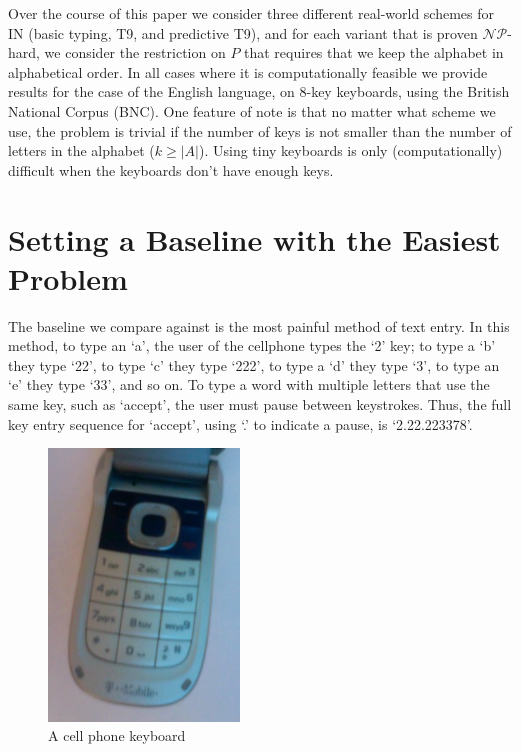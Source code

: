 \documentclass[runningheads]{llncs}
\newcommand{\NP}{\ensuremath{\mathcal{NP}}}
\begin{document}
Over the course of this paper we consider three different real-world schemes
for $\mathrm{IN}$ (basic typing, T9, and predictive T9), and for each variant
that is proven \NP-hard, we consider the restriction on $P$ that requires that
we keep the alphabet in alphabetical order.  In all cases where it is
computationally feasible we provide results for the case of the English
language, on 8-key keyboards, using the British National Corpus\cite{bnc}
(BNC).  One feature of note is that no matter what scheme we use, the problem
is trivial if the number of keys is not smaller than the number of letters in
the alphabet ($k \ge |A|$).  Using tiny keyboards is only (computationally)
difficult when the keyboards don't have enough keys.

\section{Setting a Baseline with the Easiest Problem}

The baseline we compare against is the most painful method of text entry.  In this
method, to type an `a', the user of the cellphone types the `2' key; to type a
`b' they type `22', to type `c' they type `222', to type a `d' they type `3',
to type an `e' they type `33', and so on.  To type a word with multiple letters
that use the same key, such as `accept', the user must pause between
keystrokes.  Thus, the full key entry sequence for `accept', using `.' to
indicate a pause, is `2.22.223378'.

\begin{figure}[t]
\begin{center}
\includegraphics[width=2in]{phonekeys.jpg}
\end{center}
\caption{A cell phone keyboard}
\label{keypic}
\end{figure}
\end{document}
